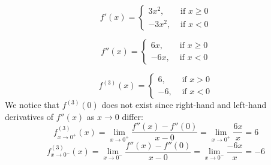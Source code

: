\documentclass{article}
\begin{document}
$$ f'(x) = \begin{cases}
        3x^2, & \text{ if $x \geq 0$} \\
        -3x^2, & \text{ if $x < 0$}
    \end{cases}
$$

$$ f''(x) = \begin{cases}
        6x, & \text{ if $x \geq 0$} \\
        -6x, & \text{ if $x < 0$}
    \end{cases}
$$

$$ f^{(3)}(x) = \begin{cases}
        6, & \text{ if $x > 0$} \\
        -6, & \text{ if $x < 0$}
    \end{cases}
$$
We notice that $f^{(3)}(0)$ does not exist since right-hand and left-hand derivatives of $f''(x)$ as $x \to 0$ differ:
$$ f_{x \to 0^+}^{(3)}(x) = \lim_{x \to 0^+} \frac{f''(x)-f''(0)}{x-0} = \lim_{x \to 0^+} \frac{6x}{x} = 6$$
$$ f_{x \to 0^-}^{(3)}(x) = \lim_{x \to 0^-} \frac{f''(x)-f''(0)}{x-0} = \lim_{x \to 0^-} \frac{-6x}{x} = -6$$
\end{document}
